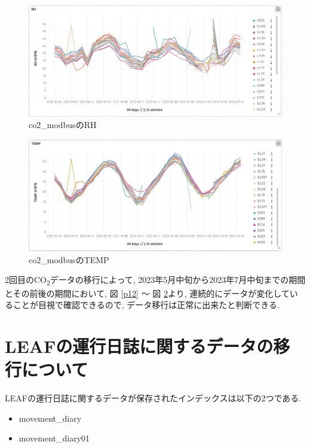 \begin{figure}[h]
  \begin{center}
    \includegraphics[width=160mm]{sotu/figure/rh.png}
    \caption{co2\_modbusのRH}
    \label{p13}
  \end{center}
\end{figure}

\begin{figure}[h]
  \begin{center}
    \includegraphics[width=160mm]{sotu/figure/temp.png}
    \caption{co2\_modbusのTEMP}
    \label{p14}
  \end{center}
\end{figure}

2回目のCO\textsubscript{2}データの移行によって, 2023年5月中旬から2023年7月中旬までの期間とその前後の期間において, 図 \ref{p12} 〜 図 \ref{p14}より, 連続的にデータが変化していることが目視で確認できるので, データ移行は正常に出来たと判断できる.

\section{LEAFの運行日誌に関するデータの移行について}

LEAFの運行日誌に関するデータが保存されたインデックスは以下の2つである.

\begin{itemize}
  \item movement\_diary
  \item movement\_diary01
\end{itemize}


